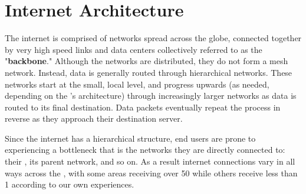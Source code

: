 \section{Internet Architecture}\label{sec:background_internet_architecture}

The internet is comprised of networks spread across the globe, connected together by very high speed links and data centers collectively referred to as the "\textbf{backbone}." Although the networks are distributed, they do not form a mesh network. Instead, data is generally routed through hierarchical networks. These networks start at the small, local level, and progress upwards (as needed, depending on the \isp's architecture) through increasingly larger networks as data is routed to its final destination. Data packets eventually repeat the process in reverse as they approach their destination server.

Since the internet has a hierarchical structure, end users are prone to experiencing a bottleneck that is the networks they are directly connected to: their \isp, its parent network, and so on. As a result internet connections vary in all ways across the \us, with some areas receiving over 50 \mbps while others receive less than 1 according to our own experiences.